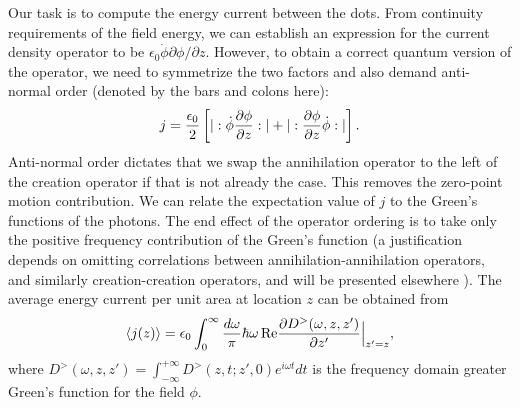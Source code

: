 \documentclass[doublecol]{epl2}
\begin{document}
Our task is to compute the energy current between the dots.  From continuity requirements of the field energy, we can establish
an expression for the current density operator to be $\epsilon_0 \dot{\phi} \partial \phi/ \partial z$.
However, to obtain a correct quantum version of the operator, we need to
symmetrize the two factors and also demand anti-normal order \cite{guidry91,jsnote1} (denoted by the bars and colons here):
\begin{equation}
j =  \frac{\epsilon_0}{2} \left[ |:\dot{\phi} {\partial \phi \over  \partial z} :| +   
|:{\partial \phi \over  \partial z}\dot{\phi}:| \right] .
\end{equation}
Anti-normal order dictates that we swap the annihilation operator to the left of the creation operator if that is not already the case.  This removes the zero-point 
motion contribution. 
We can relate the expectation value of
$j$ to the Green's functions of the photons.  The end effect of the operator ordering is to take only the positive frequency contribution of the Green's function
(a justification depends on omitting correlations between annihilation-annihilation operators, and similarly creation-creation operators, and will be presented elsewhere \cite{peng-long-PRB}).  
The average energy current per unit area at location $z$ can be obtained from 
\begin{equation}
\label{eqj}
\langle j(z) \rangle = 
\epsilon_0 \int_0^\infty { d\omega \over \pi} \hbar \omega\, {\rm Re}
{ \partial D^>(\omega, z,z') \over \partial z'}\Big|_{z'=z},
\end{equation}
where $D^{>}(\omega, z,z') = \int_{-\infty}^{+\infty} D^{>}(z,t;z',0) e^{i \omega t} dt$
is the frequency domain greater Green's function for the field $\phi$. 
\end{document}
